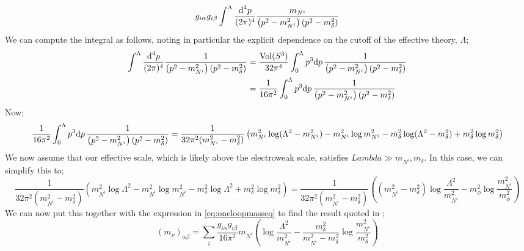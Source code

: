\documentclass[10pt]{article}
\begin{document}
\begin{equation}
  g_{i\alpha}g_{i\beta}\int^{\Lambda}{\frac{\text{d}^4 p}{(2\pi)^4}\frac{m_{N^i}}{\left(p^2 - m_{N^i}^2\right)(p^2 - m_\delta^2)}}
\end{equation}
We can compute the integral as follows, noting in particular the explicit dependence on the cutoff of the effective theory, $\Lambda$;
\begin{align*}
  \int^{\Lambda}{\frac{\text{d}^4 p}{(2\pi)^4}\frac{1}{\left(p^2 - m_{N^i}^2\right)(p^2 - m_\delta^2)}} &= \frac{\text{Vol}(S^3)}{32\pi^4}\int_{0}^{\Lambda}{p^3 \text{d}p \, \frac{1}{\left(p^2 - m_{N^i}^2\right)(p^2 - m_\delta^2)}} \\
  &= \frac{1}{16\pi^2}\int_{0}^{\Lambda}{p^3 \text{d}p \, \frac{1}{\left(p^2 - m_{N^i}^2\right)(p^2 - m_\delta^2)}}
\end{align*}
Now;
\begin{dmath}
  \frac{1}{16\pi^2}\int_{0}^{\Lambda}{p^3 \upd{p} \frac{1}{\left(p^2 - m_{N^i}^2\right)(p^2 - m_\delta^2)}} = \frac{1}{32\pi^2(m_{N^i}^2 - m_\delta^2)}\left(m_{N^i}^2 \log(\Lambda^2 - m_{N^i}^2) - m_{N^i}^2 \log m_{N^i}^2 - m_\delta^2 \log(\Lambda^2 - m_\delta^2) + m_\delta^2 \log m_\delta^2\right)
\end{dmath}
We now assume that our effective scale, which is likely above the electroweak scale, satisfies $Lambda \gg m_{N^i}, m_\delta$. In this case, we can simplify this to;
\begin{dmath}
\frac{1}{32\pi^2(m_{N^i}^2 - m_\delta^2)}\left(m_{N^i}^2 \log\Lambda^2 - m_{N^i}^2 \log m_{N^i}^2 - m_\delta^2 \log\Lambda^2 + m_\delta^2 \log m_\delta^2\right) = \frac{1}{32\pi^2(m_{N^i}^2 - m_\delta^2)} \left((m_{N^i}^2 - m_\delta^2)\log \frac{\Lambda^2}{m_{N^i}^2} - m_\phi^2 \log\frac{m_{N^i}^2}{m_\phi^2}\right)
\end{dmath}
We can now put this together with the expression in \eqref{eq:oneloopmasseq} to find the result quoted in \cite{Farzan2010, Boehm2006, Farzan2011};
\begin{equation}\label{eq:oneloopmass result}
  (m_\nu)_{\alpha\beta} = \sum_{i}{\frac{g_{i\alpha}g_{i\beta}}{16\pi^2}m_{N^i}\left(\log\frac{\Lambda^2}{m_{N^i}^2} - \frac{m_\delta^2}{m_{N^i}^2 - m_\delta^2}\log\frac{m_{N^i}^2}{m_\delta^2}\right)}
\end{equation}
\end{document}
